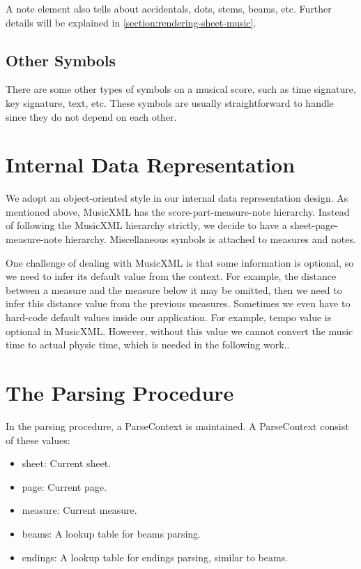 A note element also tells about accidentals, dots, stems, beams, etc. Further details will be explained in \ref{section:rendering-sheet-music}.

\subsection{Other Symbols}
There are some other types of symbols on a musical score, such as time signature, key signature, text, etc. These symbols are usually straightforward to handle since they do not depend on each other.

\section{Internal Data Representation}
We adopt an object-oriented style in our internal data representation design. As mentioned above, MusicXML has the score-part-measure-note hierarchy. Instead of following the MusicXML hierarchy strictly, we decide to have a sheet-page-measure-note hierarchy. Miscellaneous symbols is attached to measures and notes.

One challenge of dealing with MusicXML is that some information is optional, so we need to infer its default value from the context. For example, the distance between a measure and the measure below it may be omitted, then we need to infer this distance value from the previous measures. Sometimes we even have to hard-code default values inside our application. For example, tempo value is optional in MusicXML. However, without this value we cannot convert the music time to actual physic time, which is needed in the following work..

\section{The Parsing Procedure}
In the parsing procedure, a ParseContext is maintained. A ParseContext consist of these values:
\begin{itemize}
    \item sheet: Current sheet.
    \item page: Current page.
    \item measure: Current measure.
    \item beams: A lookup table for beams parsing.
    \item endings: A lookup table for endings parsing, similar to beams.
\end{itemize}

